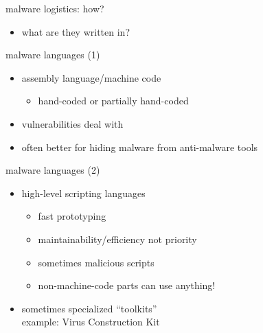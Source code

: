 
\begin{frame}{malware logistics: how?}
    \begin{itemize}
    \item what are they written in?
    \end{itemize}
\end{frame}

\begin{frame}{malware languages (1)}
    \begin{itemize}
    \item assembly language/machine code
        \begin{itemize}
        \item hand-coded or partially hand-coded
        \end{itemize}
    \vspace{.5cm}
    \item vulnerabilities deal with 
    \item often better for hiding malware from anti-malware tools
    \end{itemize}
\end{frame}

\begin{frame}{malware languages (2)}
    \begin{itemize}
    \item high-level scripting languages
        \begin{itemize}
        \item fast prototyping
        \item maintainability/efficiency not priority
        \item sometimes malicious scripts
        \item non-machine-code parts can use anything!
        \end{itemize}
    \item sometimes specialized ``toolkits'' \\
          example: Virus Construction Kit
    \end{itemize}
\end{frame}



